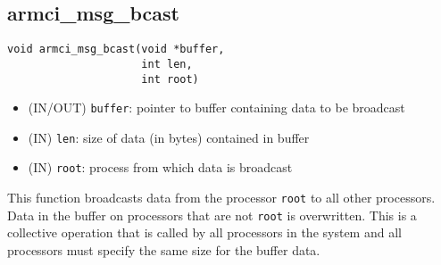 \documentclass[12pt]{article}
\begin{document}
\subsection{armci\_msg\_bcast}
\begin{verbatim}
void armci_msg_bcast(void *buffer,
                     int len,
                     int root)
\end{verbatim}
\begin{itemize}
\item (IN/OUT) \texttt{buffer}: pointer to buffer containing data to be broadcast
\item (IN) \texttt{len}: size of data (in bytes) contained in buffer
\item (IN) \texttt{root}: process from which data is broadcast
\end{itemize}
This function broadcasts data from the processor \texttt{root} to all other
processors. Data in the buffer on processors that are not \texttt{root} is
overwritten. This is a collective operation that is called by all processors
in the system and all processors must specify the same size for the buffer data.
\end{document}
